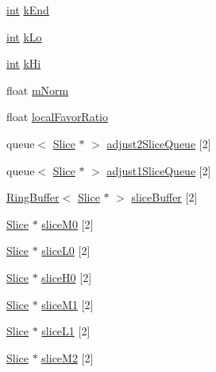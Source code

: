 \begin{DoxyCompactItemize}
\item 
\hyperlink{xmltok_8h_a5a0d4a5641ce434f1d23533f2b2e6653}{int} \hyperlink{class__sbsms___1_1_s_m_s_aecd4c17d144a8d61870a016cb24fc1ce}{k\+End}
\item 
\hyperlink{xmltok_8h_a5a0d4a5641ce434f1d23533f2b2e6653}{int} \hyperlink{class__sbsms___1_1_s_m_s_ac4afa7d1c254586b2899f56789feb69b}{k\+Lo}
\item 
\hyperlink{xmltok_8h_a5a0d4a5641ce434f1d23533f2b2e6653}{int} \hyperlink{class__sbsms___1_1_s_m_s_a5ac9edbfa51e207fd88baa41307b1793}{k\+Hi}
\item 
float \hyperlink{class__sbsms___1_1_s_m_s_adf150d7f79f444993cbfd4fe7ddc2bd5}{m\+Norm}
\item 
float \hyperlink{class__sbsms___1_1_s_m_s_a3073f4d6568aee0c116315885057f1a0}{local\+Favor\+Ratio}
\item 
queue$<$ \hyperlink{class__sbsms___1_1_slice}{Slice} $\ast$ $>$ \hyperlink{class__sbsms___1_1_s_m_s_af5418699dec42bb2954fb7c7a95cfe41}{adjust2\+Slice\+Queue} \mbox{[}2\mbox{]}
\item 
queue$<$ \hyperlink{class__sbsms___1_1_slice}{Slice} $\ast$ $>$ \hyperlink{class__sbsms___1_1_s_m_s_aa9df562c88027148365c10728e2eda94}{adjust1\+Slice\+Queue} \mbox{[}2\mbox{]}
\item 
\hyperlink{class__sbsms___1_1_ring_buffer}{Ring\+Buffer}$<$ \hyperlink{class__sbsms___1_1_slice}{Slice} $\ast$ $>$ \hyperlink{class__sbsms___1_1_s_m_s_acc7122b5c39e60aef013ba910499f5d1}{slice\+Buffer} \mbox{[}2\mbox{]}
\item 
\hyperlink{class__sbsms___1_1_slice}{Slice} $\ast$ \hyperlink{class__sbsms___1_1_s_m_s_a5a044a20639e3dc1b9018bbe75512a28}{slice\+M0} \mbox{[}2\mbox{]}
\item 
\hyperlink{class__sbsms___1_1_slice}{Slice} $\ast$ \hyperlink{class__sbsms___1_1_s_m_s_adaf0a873bd30f2b760005dcd92bead87}{slice\+L0} \mbox{[}2\mbox{]}
\item 
\hyperlink{class__sbsms___1_1_slice}{Slice} $\ast$ \hyperlink{class__sbsms___1_1_s_m_s_ae6343140f71bce6818937b85e48b6d5c}{slice\+H0} \mbox{[}2\mbox{]}
\item 
\hyperlink{class__sbsms___1_1_slice}{Slice} $\ast$ \hyperlink{class__sbsms___1_1_s_m_s_a7d93c5c5854ef82a82eb12bf7ad5996f}{slice\+M1} \mbox{[}2\mbox{]}
\item 
\hyperlink{class__sbsms___1_1_slice}{Slice} $\ast$ \hyperlink{class__sbsms___1_1_s_m_s_a11ef2408fd487a465a2177f7dfa0bb9c}{slice\+L1} \mbox{[}2\mbox{]}
\item 
\hyperlink{class__sbsms___1_1_slice}{Slice} $\ast$ \hyperlink{class__sbsms___1_1_s_m_s_a3ab61570824f85add3c147327a9f268e}{slice\+M2} \mbox{[}2\mbox{]}

\end{DoxyCompactItemize}

